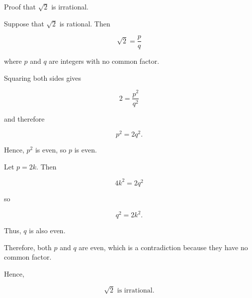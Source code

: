 \documentclass{article}
\begin{document}
	
	Proof that $\sqrt{2}$ is irrational.
	
	Suppose that $\sqrt{2}$ is rational. Then
	
	\[
	\sqrt{2} = \frac{p}{q}
	\]
	
	where $p$ and $q$ are integers with no common factor.
	
	Squaring both sides gives
	
	\[
	2 = \frac{p^2}{q^2}
	\]
	
	and therefore
	
	\[
	p^2 = 2q^2.
	\]
	
	Hence, $p^2$ is even, so $p$ is even.
	
	Let $p = 2k$. Then
	
	\[
	4k^2 = 2q^2
	\]
	
	so
	
	\[
	q^2 = 2k^2.
	\]
	
	Thus, $q$ is also even.
	
	Therefore, both $p$ and $q$ are even, which is a contradiction because they have no common factor.
	
	Hence,
	
	\[
	\sqrt{2}\text{ is irrational.}
	\]
	
\end{document}
